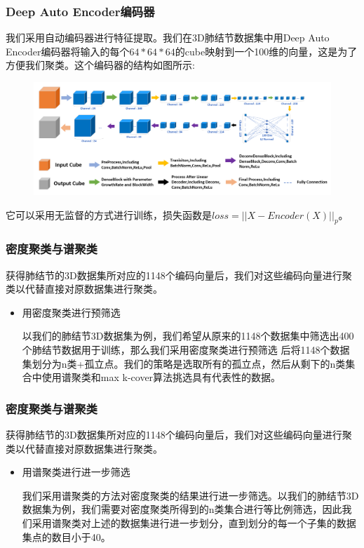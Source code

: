 \documentclass[9pt]{beamer}
\begin{document}
\begin{frame}[fragile]
	\frametitle{Deep Auto Encoder编码器}
	我们采用自动编码器进行特征提取。我们在3D肺结节数据集中用Deep Auto Encoder编码器将输入的每个$64*64*64$的cube映射到一个100维的向量，这是为了
	方便我们聚类。这个编码器的结构如图所示:
	\begin{figure}[H]%
		\centering
		\includegraphics[width=12cm]{DenseEncoder.png}%
	\end{figure}
	它可以采用无监督的方式进行训练，损失函数是$loss=||X-Encoder(X)||_p$。
	
\end{frame}



\begin{frame}[fragile]
	\frametitle{密度聚类与谱聚类}
	获得肺结节的3D数据集所对应的1148个编码向量后，我们对这些编码向量进行聚类以代替直接对原数据集进行聚类。
	\begin{itemize}
		\item 用密度聚类进行预筛选
		
		以我们的肺结节3D数据集为例，我们希望从原来的1148个数据集中筛选出400个肺结节数据用于训练，那么我们采用密度聚类进行预筛选
		后将1148个数据集划分为n类+孤立点。我们的策略是选取所有的孤立点，然后从剩下的n类集合中使用谱聚类和max k-cover算法挑选具有代表性的数据。

		
	\end{itemize}

	
\end{frame}

\begin{frame}[fragile]
	\frametitle{密度聚类与谱聚类}
	获得肺结节的3D数据集所对应的1148个编码向量后，我们对这些编码向量进行聚类以代替直接对原数据集进行聚类。
	\begin{itemize}
		\item 用谱聚类进行进一步筛选

		我们采用谱聚类的方法对密度聚类的结果进行进一步筛选。以我们的肺结节3D数据集为例，我们需要对密度聚类所得到的n类集合进行等比例筛选，因此我们采用谱聚类对上述的数据集进行进一步划分，直到划分的每一个子集的数据集点的数目小于40。
		
	\end{itemize}

	
\end{frame}
\end{document}
